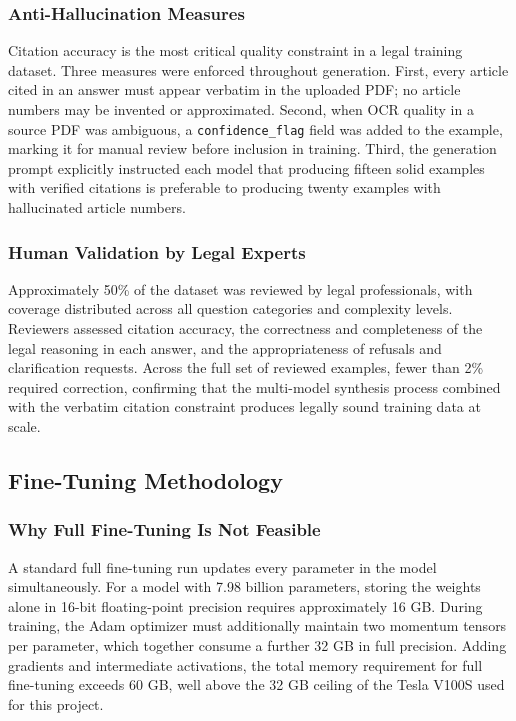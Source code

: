 \subsubsection{Anti-Hallucination Measures}

Citation accuracy is the most critical quality constraint in a legal training dataset. Three measures were enforced throughout generation. First, every article cited in an answer must appear verbatim in the uploaded \ac{PDF}; no article numbers may be invented or approximated. Second, when \ac{OCR} quality in a source \ac{PDF} was ambiguous, a \texttt{confidence\_flag} field was added to the example, marking it for manual review before inclusion in training. Third, the generation prompt explicitly instructed each model that producing fifteen solid examples with verified citations is preferable to producing twenty examples with hallucinated article numbers.

\subsubsection{Human Validation by Legal Experts}

Approximately 50\% of the dataset was reviewed by legal professionals, with coverage distributed across all question categories and complexity levels. Reviewers assessed citation accuracy, the correctness and completeness of the legal reasoning in each answer, and the appropriateness of refusals and clarification requests. Across the full set of reviewed examples, fewer than 2\% required correction, confirming that the multi-model synthesis process combined with the verbatim citation constraint produces legally sound training data at scale.

\subsection{Fine-Tuning Methodology}
\label{sec:finetuning-methodology}

\subsubsection{Why Full Fine-Tuning Is Not Feasible}

A standard full fine-tuning run updates every parameter in the model simultaneously. For a model with 7.98 billion parameters, storing the weights alone in 16-bit floating-point precision requires approximately 16 GB. During training, the Adam optimizer \cite{kingma2014adam} must additionally maintain two momentum tensors per parameter, which together consume a further 32 GB in full precision. Adding gradients and intermediate activations, the total memory requirement for full fine-tuning exceeds 60 GB, well above the 32 GB ceiling of the Tesla V100S used for this project.


